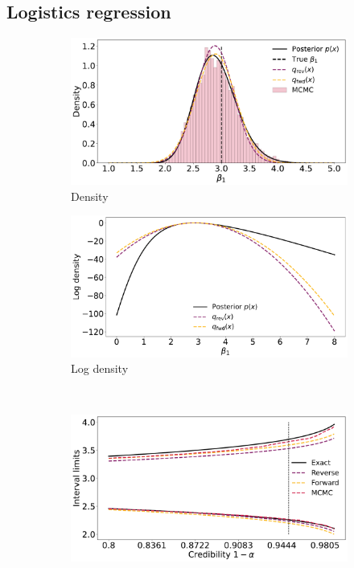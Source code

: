 \subsection{Logistics regression}

\begin{figure}[ht]
    \begin{subfigure}{0.475\linewidth}
    \centering
    \includegraphics[width=\linewidth]{fig/logreg_q.pdf}
    \caption{Density}
    \label{fig:logreg_p}
    \end{subfigure}%
    \begin{subfigure}{0.475\linewidth}
        \centering
        \includegraphics[width=\linewidth]{fig/logreg_logq.pdf}
        \caption{Log density}
        \label{fig:logreg_lp}
        \end{subfigure}\\[1ex]
    \begin{subfigure}{\linewidth}
    \centering
    \includegraphics[width=0.8\linewidth]{fig/logreg_cilims.pdf}

\end{subfigure}
\end{figure}
